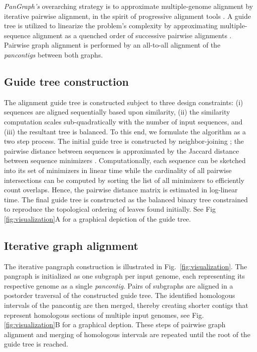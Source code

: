 \documentclass[aps,rmp,reprint,superscriptaddress,notitlepage,10pt]{revtex4-1}
\begin{document}
\emph{PanGraph's} overarching strategy is to approximate multiple-genome alignment by iterative pairwise alignment, in the spirit of progressive alignment tools \cite{darling2010progressivemauve,armstrong2020progressive}.
A guide tree is utilized to linearize the problem's complexity by approximating multiple-sequence alignment as a quenched order of successive pairwise alignments \cite{feng1987progressive}.
Pairwise graph alignment is performed by an all-to-all alignment of the \emph{pancontigs} between both graphs.

\subsection{Guide tree construction}
The alignment guide tree is constructed subject to three design constraints: (i) sequences are aligned sequentially based upon similarity, (ii) the similarity computation scales sub-quadratically with the number of input sequences, and (iii) the resultant tree is balanced.
To this end, we formulate the algorithm as a two step process.
The initial guide tree is constructed by neighbor-joining \cite{saitou1987neighbor}; the pairwise distance between sequences is approximated by the Jaccard distance between sequence minimizers \cite{roberts2004reducing}.
Computationally, each sequence can be sketched into its set of minimizers in linear time while the cardinality of all pairwise intersections can be computed by sorting the list of all minimizers to efficiently count overlaps.
Hence, the pairwise distance matrix is estimated in log-linear time.
The final guide tree is constructed as the balanced binary tree constrained to reproduce the topological ordering of leaves found initially.
See Fig \ref{fig:visualization}A for a graphical depiction of the guide tree.

\subsection{Iterative graph alignment}
The iterative pangraph construction is illustrated in Fig.~\ref{fig:visualization}.
The pangraph is initialized as one subgraph per input genome, each representing its respective genome as a single \emph{pancontig}.
Pairs of subgraphs are aligned in a postorder traversal of the constructed guide tree.
The identified homologous intervals of the pancontig are then merged, thereby creating shorter contigs that represent homologous sections of multiple input genomes, see Fig. \ref{fig:visualization}B for a graphical deption.
These steps of pairwise graph alignment and merging of homologous intervals are repeated until the root of the guide tree is reached.
\end{document}
